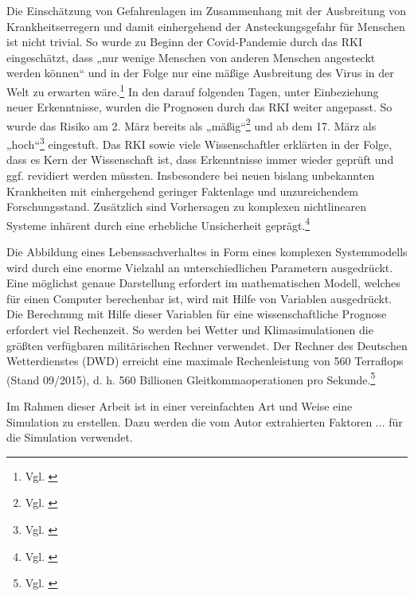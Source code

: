 \documentclass[12pt]{article}
\begin{document}
Die Einschätzung von Gefahrenlagen im Zusammenhang mit der Ausbreitung von Krankheitserregern und damit einhergehend der Ansteckungsgefahr für Menschen ist nicht trivial. So wurde zu Beginn der Covid-Pandemie durch das RKI eingeschätzt, dass „nur wenige Menschen von anderen Menschen angesteckt werden können“ und in der Folge nur eine mäßige Ausbreitung des Virus in der Welt zu erwarten wäre.\footnote{Vgl. \cite{MerkurRKI}} In den darauf folgenden Tagen, unter Einbeziehung neuer Erkenntnisse, wurden die Prognosen durch das RKI weiter angepasst. So wurde das Risiko am 2. März bereits als „mäßig“\footnote{Vgl. \cite{ARDMedia01}} und ab dem 17. März als „hoch“\footnote{Vgl. \cite{RKIhoch}} eingestuft. Das RKI sowie viele Wissenschaftler erklärten in der Folge, dass es Kern der Wissenschaft ist, dass Erkenntnisse immer wieder geprüft und ggf. revidiert werden müssten. Insbesondere bei neuen bislang unbekannten Krankheiten mit einhergehend geringer Faktenlage und unzureichendem Forschungsstand. Zusätzlich sind Vorhersagen zu komplexen nichtlinearen Systeme inhärent durch eine erhebliche Unsicherheit geprägt.\footnote{Vgl. \cite{ZDFWissenschaft}}

Die Abbildung eines Lebenssachverhaltes in Form eines komplexen Systemmodells wird durch eine enorme Vielzahl an unterschiedlichen Parametern ausgedrückt. Eine möglichst genaue Darstellung erfordert im mathematischen Modell, welches für einen Computer berechenbar ist, wird mit Hilfe von Variablen ausgedrückt. Die Berechnung mit Hilfe dieser Variablen für eine wissenschaftliche Prognose erfordert viel Rechenzeit. So werden bei Wetter und Klimasimulationen die größten verfügbaren militärischen Rechner verwendet. Der Rechner des Deutschen Wetterdienstes (DWD) erreicht eine maximale Rechenleistung von 560 Terraflops (Stand 09/2015), d. h. 560 Billionen Gleitkommaoperationen pro Sekunde.\footnote{Vgl. \cite{WeltDerPhysik}}

Im Rahmen dieser Arbeit ist in einer vereinfachten Art und Weise eine Simulation zu erstellen. Dazu werden die vom Autor extrahierten Faktoren ... für die Simulation verwendet.
\end{document}
